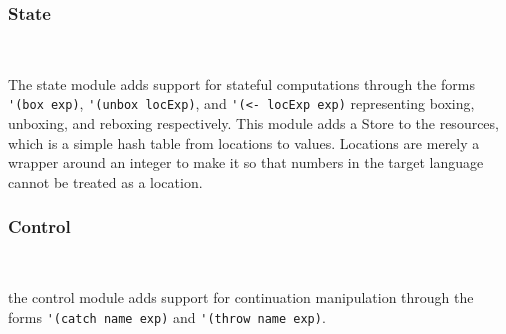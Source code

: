 \subsubsection{State}
~

The state module adds support for stateful computations through the forms \verb#'(box exp)#, \verb#'(unbox locExp)#, and \verb#'(<- locExp exp)# representing boxing, unboxing, and reboxing respectively. This module adds a Store to the resources, which is a simple hash table from locations to values. Locations are merely a wrapper around an integer to make it so that numbers in the target language cannot be treated as a location.

\subsubsection{Control}
~

the control module adds support for continuation manipulation through the forms \verb#'(catch name exp)# and \verb#'(throw name exp)#.
